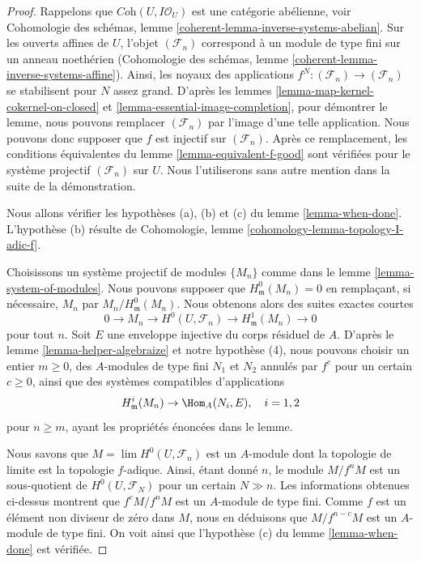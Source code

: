 \begin{proof}
Rappelons que $\textit{Coh}(U, I\mathcal{O}_U)$ est une catégorie abélienne, voir
Cohomologie des schémas, lemme \ref{coherent-lemma-inverse-systems-abelian}.
Sur les ouverts affines de $U$, l'objet $(\mathcal{F}_n)$
correspond à un module de type fini sur un anneau noethérien
(Cohomologie des schémas, lemme \ref{coherent-lemma-inverse-systems-affine}).
Ainsi, les noyaux des applications $f^N : (\mathcal{F}_n) \to (\mathcal{F}_n)$
se stabilisent pour $N$ assez grand. D'après les
lemmes \ref{lemma-map-kernel-cokernel-on-closed} et
\ref{lemma-essential-image-completion},
pour démontrer le lemme,
nous pouvons remplacer $(\mathcal{F}_n)$ par l'image d'une telle application.
Nous pouvons donc supposer que $f$ est injectif sur $(\mathcal{F}_n)$.
Après ce remplacement, les conditions équivalentes du
lemme \ref{lemma-equivalent-f-good} sont vérifiées pour le système projectif
$(\mathcal{F}_n)$ sur $U$. Nous l'utiliserons sans autre mention
dans la suite de la démonstration.

\medskip\noindent
Nous allons vérifier les hypothèses (a), (b) et (c) du
lemme \ref{lemma-when-done}. L'hypothèse (b) résulte de
Cohomologie, lemme \ref{cohomology-lemma-topology-I-adic-f}.

\medskip\noindent
Choisissons un système projectif de modules $\{M_n\}$ comme dans le
lemme \ref{lemma-system-of-modules}.
Nous pouvons supposer que $H^0_\mathfrak m(M_n) = 0$ en remplaçant, si nécessaire, $M_n$ par
$M_n/H^0_\mathfrak m(M_n)$. Nous obtenons alors des suites
exactes courtes
$$
0 \to M_n \to H^0(U, \mathcal{F}_n) \to H^1_\mathfrak m(M_n) \to 0
$$
pour tout $n$. Soit $E$ une enveloppe injective du corps résiduel de $A$.
D'après le lemme \ref{lemma-helper-algebraize} et notre hypothèse (4),
nous pouvons choisir un entier $m \geq 0$, des $A$-modules de type fini
$N_1$ et $N_2$ annulés par $f^c$ pour un certain $c \geq 0$, ainsi que des
systèmes compatibles d'applications
$$
H^i_\mathfrak m(M_n) \to \Hom_A(N_i, E), \quad i = 1, 2
$$
pour $n \geq m$,
ayant les propriétés énoncées dans le lemme.

\medskip\noindent
Nous savons que $M = \lim H^0(U, \mathcal{F}_n)$ est un $A$-module dont la
topologie de limite est la topologie $f$-adique. Ainsi, étant donné $n$, le module
$M/f^nM$ est un sous-quotient de $H^0(U, \mathcal{F}_N)$ pour un certain $N \gg n$.
Les informations obtenues ci-dessus montrent que
$f^cM/f^nM$ est un $A$-module de type fini. Comme $f$ est un élément non diviseur de zéro
dans $M$, nous en déduisons que $M/f^{n - c}M$ est un $A$-module de type fini.
On voit ainsi que l'hypothèse (c) du lemme \ref{lemma-when-done} est vérifiée.


\end{proof}
